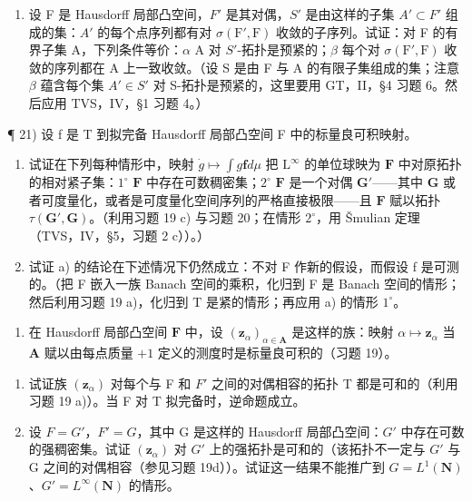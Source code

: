 \begin{enumerate}
\def\labelenumi{\arabic{enumi})}
\setcounter{enumi}{19}
\tightlist
\item
  设 F 是 Hausdorff 局部凸空间，\(F'\) 是其对偶，\(S'\) 是由这样的子集 \(A' \subset F'\) 组成的集：\(A'\) 的每个点序列都有对 \(\sigma(\mathrm{F}',\mathrm{F})\) 收敛的子序列。试证：对 F 的有界子集 A，下列条件等价：\(\alpha\) A 对 \(S'\)-拓扑是预紧的；\(\beta\) 每个对 \(\sigma(\mathrm{F}',\mathrm{F})\) 收敛的序列都在 A 上一致收敛。（设 S 是由 F 与 A 的有限子集组成的集；注意 \(\beta\) 蕴含每个集 \(A' \in S'\) 对 S-拓扑是预紧的，这里要用 GT，II，§4 习题 6。然后应用 TVS，IV，§1 习题 4。）
\end{enumerate}

¶ 21) 设 f 是 T 到拟完备 Hausdorff 局部凸空间 F 中的标量良可积映射。

\begin{enumerate}
\def\labelenumi{\alph{enumi})}
\item
  试证在下列每种情形中，映射 \(\dot{g} \mapsto \int g\mathbf{f}  d\mu\) 把 \(\mathrm{L}^{\infty}\) 的单位球映为 \(\mathbf{F}\) 中对原拓扑的相对紧子集：\(1^{\circ}\) \(\mathbf{F}\) 中存在可数稠密集；\(2^{\circ}\) \(\mathbf{F}\) 是一个对偶 \(\mathbf{G}'\)——其中 \(\mathbf{G}\) 或者可度量化，或者是可度量化空间序列的严格直接极限——且 \(\mathbf{F}\) 赋以拓扑 \(\tau (\mathbf{G}',\mathbf{G})\)。（利用习题 19 c) 与习题 20；在情形 \(2^{\circ}\)，用 Šmulian 定理（TVS，IV，§5，习题 2 c））。）
\item
  试证 a) 的结论在下述情况下仍然成立：不对 F 作新的假设，而假设 f 是可测的。（把 F 嵌入一族 Banach 空间的乘积，化归到 F 是 Banach 空间的情形；然后利用习题 19 a)，化归到 T 是紧的情形；再应用 a) 的情形 \(1^{\circ}\)。
\end{enumerate}

\begin{enumerate}
\def\labelenumi{\arabic{enumi})}
\setcounter{enumi}{21}
\tightlist
\item
  在 Hausdorff 局部凸空间 \(\mathbf{F}\) 中，设 \((\mathbf{z}_{\alpha})_{\alpha \in \mathbf{A}}\) 是这样的族：映射 \(\alpha \mapsto \mathbf{z}_{\alpha}\) 当 \(\mathbf{A}\) 赋以由每点质量 \(+1\) 定义的测度时是标量良可积的（习题 19）。
\end{enumerate}

\begin{enumerate}
\def\labelenumi{\alph{enumi})}
\item
  试证族 \((\mathbf{z}_{\alpha})\) 对每个与 F 和 \(F'\) 之间的对偶相容的拓扑 T 都是可和的（利用习题 19 a)）。当 F 对 T 拟完备时，逆命题成立。
\item
  设 \(F = G'\)，\(F' = G\)，其中 G 是这样的 Hausdorff 局部凸空间：\(G'\) 中存在可数的强稠密集。试证 \((\mathbf{z}_{\alpha})\) 对 \(G'\) 上的强拓扑是可和的（该拓扑不一定与 \(G'\) 与 G 之间的对偶相容（参见习题 19d））。试证这一结果不能推广到 \(G = L^{1}(\mathbf{N})\)、\(G' = L^{\infty}(\mathbf{N})\) 的情形。
\end{enumerate}

